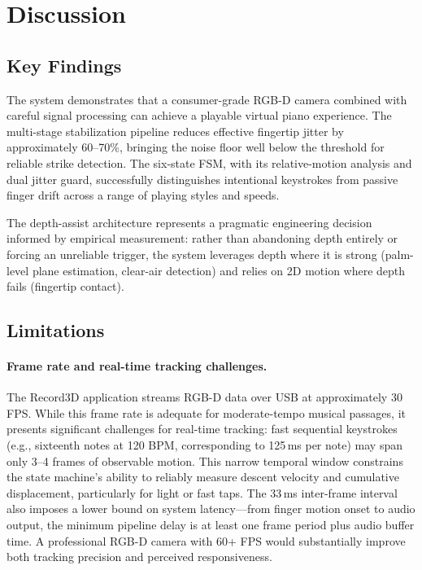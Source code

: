 \documentclass[11pt,a4paper]{article}
\begin{document}
\section{Discussion}

\subsection{Key Findings}

The system demonstrates that a consumer-grade RGB-D camera combined with careful signal processing can achieve a playable virtual piano experience.
The multi-stage stabilization pipeline reduces effective fingertip jitter by approximately 60--70\%, bringing the noise floor well below the threshold for reliable strike detection.
The six-state FSM, with its relative-motion analysis and dual jitter guard, successfully distinguishes intentional keystrokes from passive finger drift across a range of playing styles and speeds.

The depth-assist architecture represents a pragmatic engineering decision informed by empirical measurement: rather than abandoning depth entirely or forcing an unreliable trigger, the system leverages depth where it is strong (palm-level plane estimation, clear-air detection) and relies on 2D motion where depth fails (fingertip contact).

\subsection{Limitations}

\paragraph{Frame rate and real-time tracking challenges.}
The Record3D application streams RGB-D data over USB at approximately 30 FPS.
While this frame rate is adequate for moderate-tempo musical passages, it presents significant challenges for real-time tracking:
fast sequential keystrokes (e.g., sixteenth notes at 120 BPM, corresponding to 125\,ms per note) may span only 3--4 frames of observable motion.
This narrow temporal window constrains the state machine's ability to reliably measure descent velocity and cumulative displacement, particularly for light or fast taps.
The 33\,ms inter-frame interval also imposes a lower bound on system latency---from finger motion onset to audio output, the minimum pipeline delay is at least one frame period plus audio buffer time.
A professional RGB-D camera with 60+ FPS would substantially improve both tracking precision and perceived responsiveness.
\end{document}

